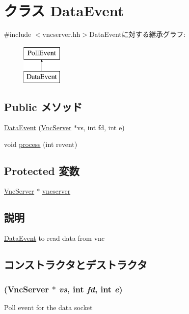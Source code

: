 \hypertarget{classVncServer_1_1DataEvent}{
\section{クラス DataEvent}
\label{classVncServer_1_1DataEvent}
}


{\ttfamily \#include $<$vncserver.hh$>$}DataEventに対する継承グラフ:\begin{figure}[H]
\begin{center}
\leavevmode
\includegraphics[height=2cm]{classVncServer_1_1DataEvent}
\end{center}
\end{figure}
\subsection*{Public メソッド}
\begin{DoxyCompactItemize}
\item 
\hyperlink{classVncServer_1_1DataEvent_ab45459d895bfa96fe30716744b4f9121}{DataEvent} (\hyperlink{classVncServer}{VncServer} $\ast$vs, int fd, int e)
\item 
void \hyperlink{classVncServer_1_1DataEvent_aedacbaeee0c89ceca526874c34f6b20b}{process} (int revent)
\end{DoxyCompactItemize}
\subsection*{Protected 変数}
\begin{DoxyCompactItemize}
\item 
\hyperlink{classVncServer}{VncServer} $\ast$ \hyperlink{classVncServer_1_1DataEvent_ac122859a241350f501e4f77da81b669f}{vncserver}
\end{DoxyCompactItemize}


\subsection{説明}
\hyperlink{classVncServer_1_1DataEvent}{DataEvent} to read data from vnc 

\subsection{コンストラクタとデストラクタ}
\hypertarget{classVncServer_1_1DataEvent_ab45459d895bfa96fe30716744b4f9121}{
\subsubsection[{DataEvent}]{ ({\bf VncServer} $\ast$ {\em vs}, \/  int {\em fd}, \/  int {\em e})}}
\label{classVncServer_1_1DataEvent_ab45459d895bfa96fe30716744b4f9121}
Poll event for the data socket 


